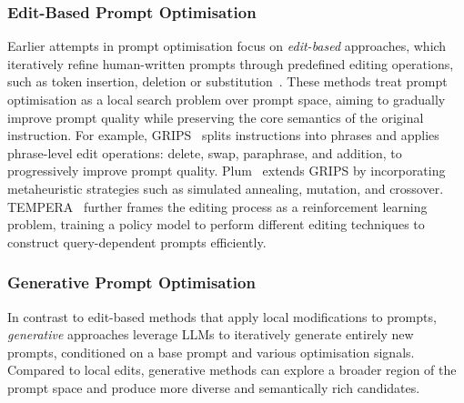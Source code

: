 \documentclass[]{selfevolagent}
\theoremstyle{plain}
\theoremstyle{definition}
\theoremstyle{remark}
\begin{document}
\subsubsection{Edit-Based Prompt Optimisation} 
Earlier attempts in prompt optimisation focus on \textit{edit-based} approaches, which iteratively refine human-written prompts through predefined editing operations, such as token insertion, deletion or substitution~\citep{prasad2023grips,pan2024plum,lu2024strings,zhang2023tempera,zhou2023survival,agarwal2024promptwizard}. These methods treat prompt optimisation as a local search problem over prompt space, aiming to gradually improve prompt quality while preserving the core semantics of the original instruction. For example, GRIPS~\citep{prasad2023grips} splits instructions into phrases and applies phrase-level edit operations: delete, swap, paraphrase, and addition, to progressively improve prompt quality. Plum~\citep{pan2024plum} extends GRIPS by incorporating metaheuristic strategies such as simulated annealing, mutation, and crossover. TEMPERA~\citep{zhang2023tempera} further frames the editing process as a reinforcement learning problem, training a policy model to perform different editing techniques to construct query-dependent prompts efficiently. 

\subsubsection{Generative Prompt Optimisation}

In contrast to edit-based methods that apply local modifications to prompts, \textit{generative} approaches leverage LLMs to iteratively generate entirely new prompts, conditioned on a base prompt and various optimisation signals. Compared to local edits, generative methods can explore a broader region of the prompt space and produce more diverse and semantically rich candidates. 
\end{document}
